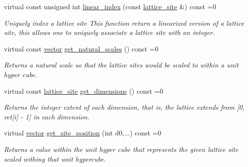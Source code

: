 \begin{DoxyCompactItemize}
\mbox{\label{classsisl_1_1base__lattice_af773eb97992177cc5249cf951f9daa40}} 
virtual const unsigned int \hyperlink{classsisl_1_1base__lattice_af773eb97992177cc5249cf951f9daa40}{linear\+\_\+index} (const \hyperlink{namespacesisl_acd18feee4026583db6185df2b25434aa}{lattice\+\_\+site} \&) const =0
\begin{DoxyCompactList}\small\item\em Uniquely index a lattice site This function return a linearized version of a lattice site, this allows one to uniquely associate a lattice site with an integer. \end{DoxyCompactList}\item 
\mbox{\label{classsisl_1_1base__lattice_a832e11c4873b26282d1061986096ca48}} 
virtual const \hyperlink{namespacesisl_a2069bd5374a9be042ff3ce3306d41e1a}{vector} \hyperlink{classsisl_1_1base__lattice_a832e11c4873b26282d1061986096ca48}{get\+\_\+natural\+\_\+scales} () const =0
\begin{DoxyCompactList}\small\item\em Returns a natural scale so that the lattice sites would be scaled to within a unit hyper cube. \end{DoxyCompactList}\item 
\mbox{\label{classsisl_1_1base__lattice_abac229515b996da70ebe94773fc6f941}} 
virtual const \hyperlink{namespacesisl_acd18feee4026583db6185df2b25434aa}{lattice\+\_\+site} \hyperlink{classsisl_1_1base__lattice_abac229515b996da70ebe94773fc6f941}{get\+\_\+dimensions} () const =0
\begin{DoxyCompactList}\small\item\em Returns the integer extent of each dimension, that is, the lattice extends from \mbox{[}0, ret\mbox{[}i\mbox{]} -\/ 1\mbox{]} in each dimension. \end{DoxyCompactList}\item 
\mbox{\label{classsisl_1_1base__lattice_a51a87e1f121f2345f8f6882a29b62f38}} 
virtual \hyperlink{namespacesisl_a2069bd5374a9be042ff3ce3306d41e1a}{vector} \hyperlink{classsisl_1_1base__lattice_a51a87e1f121f2345f8f6882a29b62f38}{get\+\_\+site\+\_\+position} (int d0,...) const =0
\begin{DoxyCompactList}\small\item\em Returns a value within the unit hyper cube that represents the given lattice site scaled withing that unit hypercube. \end{DoxyCompactList}\item 

\end{DoxyCompactItemize}
